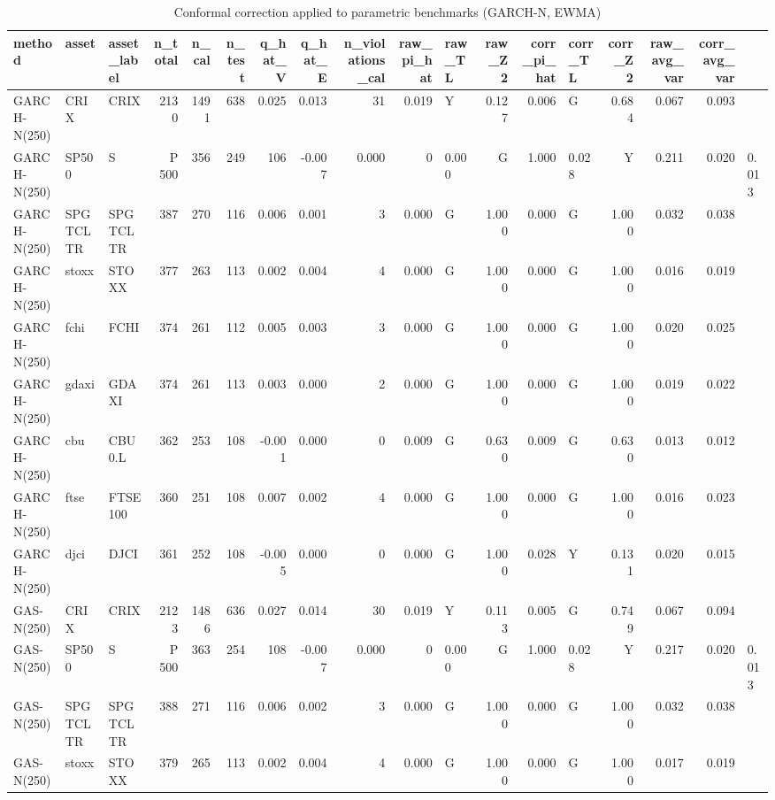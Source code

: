 \begin{table}[H]
  \centering
  \caption{Conformal correction applied to parametric benchmarks (GARCH-N, EWMA)}
  \label{tab:garch_conformal}
  \footnotesize
\begin{tabular}{lllrrrrrrrlrrlrrr}
\toprule
method & asset & asset_label & n_total & n_cal & n_test & q_hat_V & q_hat_E & n_violations_cal & raw_pi_hat & raw_TL & raw_Z2 & corr_pi_hat & corr_TL & corr_Z2 & raw_avg_var & corr_avg_var \\
\midrule
GARCH-N(250) & CRIX & CRIX & 2130 & 1491 & 638 & 0.025 & 0.013 & 31 & 0.019 & Y & 0.127 & 0.006 & G & 0.684 & 0.067 & 0.093 \\
GARCH-N(250) & SP500 & S&P 500 & 356 & 249 & 106 & -0.007 & 0.000 & 0 & 0.000 & G & 1.000 & 0.028 & Y & 0.211 & 0.020 & 0.013 \\
GARCH-N(250) & SPGTCLTR & SPGTCLTR & 387 & 270 & 116 & 0.006 & 0.001 & 3 & 0.000 & G & 1.000 & 0.000 & G & 1.000 & 0.032 & 0.038 \\
GARCH-N(250) & stoxx & STOXX & 377 & 263 & 113 & 0.002 & 0.004 & 4 & 0.000 & G & 1.000 & 0.000 & G & 1.000 & 0.016 & 0.019 \\
GARCH-N(250) & fchi & FCHI & 374 & 261 & 112 & 0.005 & 0.003 & 3 & 0.000 & G & 1.000 & 0.000 & G & 1.000 & 0.020 & 0.025 \\
GARCH-N(250) & gdaxi & GDAXI & 374 & 261 & 113 & 0.003 & 0.000 & 2 & 0.000 & G & 1.000 & 0.000 & G & 1.000 & 0.019 & 0.022 \\
GARCH-N(250) & cbu & CBU0.L & 362 & 253 & 108 & -0.001 & 0.000 & 0 & 0.009 & G & 0.630 & 0.009 & G & 0.630 & 0.013 & 0.012 \\
GARCH-N(250) & ftse & FTSE100 & 360 & 251 & 108 & 0.007 & 0.002 & 4 & 0.000 & G & 1.000 & 0.000 & G & 1.000 & 0.016 & 0.023 \\
GARCH-N(250) & djci & DJCI & 361 & 252 & 108 & -0.005 & 0.000 & 0 & 0.000 & G & 1.000 & 0.028 & Y & 0.131 & 0.020 & 0.015 \\
GAS-N(250) & CRIX & CRIX & 2123 & 1486 & 636 & 0.027 & 0.014 & 30 & 0.019 & Y & 0.113 & 0.005 & G & 0.749 & 0.067 & 0.094 \\
GAS-N(250) & SP500 & S&P 500 & 363 & 254 & 108 & -0.007 & 0.000 & 0 & 0.000 & G & 1.000 & 0.028 & Y & 0.217 & 0.020 & 0.013 \\
GAS-N(250) & SPGTCLTR & SPGTCLTR & 388 & 271 & 116 & 0.006 & 0.002 & 3 & 0.000 & G & 1.000 & 0.000 & G & 1.000 & 0.032 & 0.038 \\
GAS-N(250) & stoxx & STOXX & 379 & 265 & 113 & 0.002 & 0.004 & 4 & 0.000 & G & 1.000 & 0.000 & G & 1.000 & 0.017 & 0.019 \\

\end{tabular}
\end{table}
